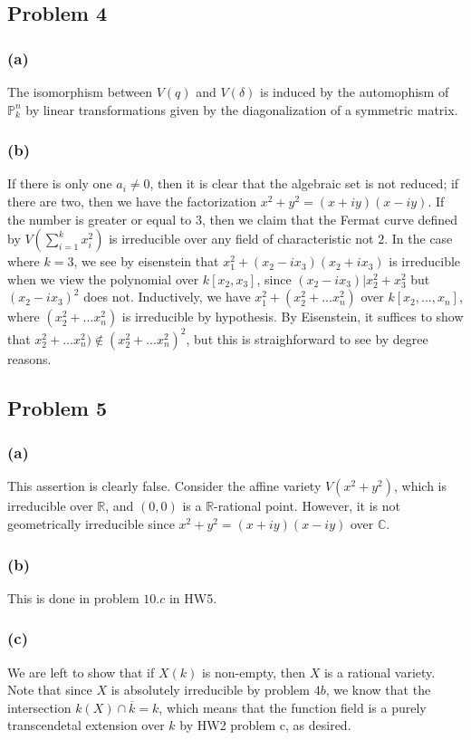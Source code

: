 \documentclass{article}
\theoremstyle{definition}
\theoremstyle{definition}
\theoremstyle{definition}
\theoremstyle{definition}
\theoremstyle{definition}
\theoremstyle{definition}
\theoremstyle{definition}
\begin{document}
\subsection*{Problem 4}
\subsubsection*{(a)}
The isomorphism between $V(q)$ and $V(\delta)$ is induced by the automophism of $\mathbb{P}_k^n$ by linear transformations given by the diagonalization of a symmetric matrix. 

\subsubsection*{(b)}
If there is only one $a_i\neq 0$, then it is clear that the algebraic set is not reduced; if there are two, then we have the factorization $x^2+y^2=(x+iy)(x-iy)$. If the number is greater or equal to $3$, then we claim that the Fermat curve defined by $V(\sum_{i=1}^{k}x_i^2)$ is irreducible over any field of characteristic not $2$. In the case where $k=3$, we see by eisenstein that $x_1^2+(x_2-ix_3)(x_2+ix_3)$ is irreducible when we view the polynomial over $k[x_2,x_3]$, since $(x_2-ix_3)|x_2^2+x_3^2$ but $(x_2-ix_3)^2$ does not. Inductively, we have $x_1^2+(x_2^2+...x_n^2)$ over $k[x_2,...,x_n]$, where $(x_2^2+...x_n^2)$ is irreducible by hypothesis. By Eisenstein, it suffices to show that $x_2^2+...x_n^2)\not \in (x_2^2+...x_n^2)^2$, but this is straighforward to see by degree reasons.

\subsection*{Problem 5}
\subsubsection*{(a)}
This assertion is clearly false. Consider the affine variety $V(x^2+y^2)$, which is irreducible over $\mathbb{R}$, and $(0,0)$ is a $\mathbb{R}$-rational point. However, it is not geometrically irreducible since $x^2+y^2=(x+iy)(x-iy)$ over $\mathbb{C}$.


\subsubsection*{(b)}
This is done in problem $10.c$ in HW5.

\subsubsection*{(c)}
We are left to show that if $X(k)$ is non-empty, then $X$ is a rational variety. Note that since $X$ is absolutely irreducible by problem $4b$, we know that the intersection $k(X)\cap \overline{k}=k$, which means that the function field is a purely transcendetal extension over $k$ by HW2 problem c, as desired.
\end{document}
